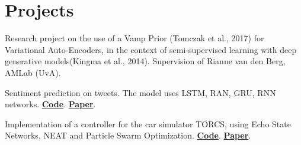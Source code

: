 \documentclass[a4paper]{deedy-resume} %
\begin{document}
\begin{minipage}[t]{0.66\textwidth}
\begin{tightitemize}
\end{tightitemize}

\sectionspace %


\section{Projects}


Research project on the use of a Vamp Prior (Tomczak et al., 2017) for Variational Auto-Encoders, in the context of semi-supervised learning with deep generative models(Kingma et al., 2014). Supervision of Rianne van den Berg, AMLab (UvA).

\sectionspace %




Sentiment prediction on tweets. The model uses LSTM, RAN, GRU, RNN networks. \href{https://github.com/davide-belli/twitter-sentiment-analysis}{\bf Code}. \href{https://drive.google.com/file/d/1lc4LsD1EB9YuhgFBXjOJwGOuPpviZUAn/view?usp=sharing}{\bf Paper}.

\sectionspace %



Implementation of a controller for the car simulator TORCS, using Echo State Networks, NEAT and Particle Swarm Optimization. \href{https://github.com/Gabri95/NEAT_competition}{\bf Code}. \href{https://drive.google.com/file/d/16B28JfZg-WyhPj26YNI4CXV6YZNqat4K/view?usp=sharing}{\bf Paper}.

\sectionspace %



\end{minipage}
\end{document}
